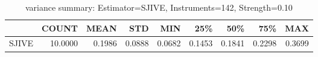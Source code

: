 \begin{table}[ht]
\centering
\caption{variance summary: Estimator=SJIVE, Instruments=142, Strength=0.10}
\begin{tabular}{lrrrrrrrr}
\toprule
 & COUNT & MEAN & STD & MIN & 25\% & 50\% & 75\% & MAX \\
\midrule
SJIVE & 10.0000 & 0.1986 & 0.0888 & 0.0682 & 0.1453 & 0.1841 & 0.2298 & 0.3699 \\
\bottomrule
\end{tabular}
\end{table}
